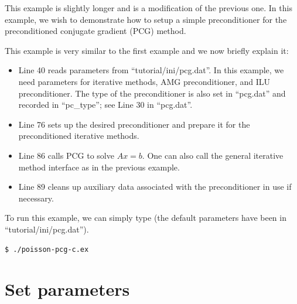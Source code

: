 \documentclass[11pt]{memoir}
\begin{document}
This example is slightly longer and is a modification of the previous one. In this example,  we wish to demonstrate how to setup a simple preconditioner for the preconditioned conjugate gradient (PCG) method.
%

%
This example is very similar to the first example and we now briefly explain it:
\begin{itemize}
%
\item Line 40 reads parameters from ``tutorial/ini/pcg.dat''. In this example, we need parameters for iterative methods, AMG preconditioner, and ILU preconditioner. The type of the preconditioner is also set in ``pcg.dat'' and recorded in ``pc\_type''; see Line 30 in ``pcg.dat''.
%
\item Line 76 sets up the desired preconditioner and prepare it for the preconditioned iterative methods.
%
\item Line 86 calls PCG to solve $Ax=b$. One can also call the general iterative method interface as in the previous example.
%
\item Line 89 cleans up auxiliary data associated with the preconditioner in use if necessary. 
%
\end{itemize}
%
To run this example, we can simply type (the default parameters have been in ``tutorial/ini/pcg.dat'').
%
\begin{lstlisting}[numbers=none]
$ ./poisson-pcg-c.ex
\end{lstlisting}


\section{Set parameters}\label{sec:parameters}
\end{document}
